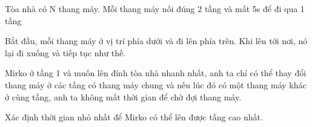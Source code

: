 Tòa nhà có N thang máy. Mỗi thang máy nối đúng 2 tầng và mất 5s để đi qua 1 tầng  

   Bắt đầu, mỗi thang máy ở vị trí phía dưới và đi lên phía trên. Khi lên tới nơi, nó lại đi xuống và tiếp tục như thế.  

   Mirko ở tầng 1 và muốn lên đỉnh tòa nhà nhanh nhất, anh ta chỉ có thể thay đổi thang máy ở các tầng có thang máy chung và nếu lúc đó có một thang máy khác ở cùng tầng, anh ta không mất thời gian để chờ đợi thang máy.  

   Xác định thời gian nhỏ nhất để Mirko có thể lên được tầng cao nhất.